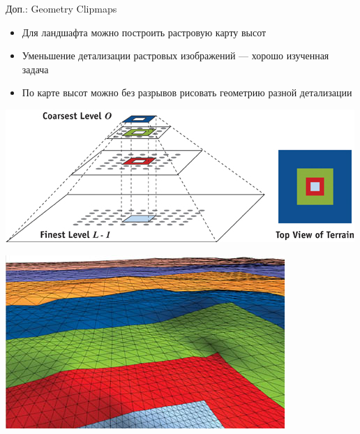 \begin{frame}{Доп.: Geometry Clipmaps}
    \begin{minipage}{.5\textwidth}
        \begin{itemize}
            \item Для ландшафта можно построить растровую карту высот
            \item Уменьшение детализации растровых изображений --- хорошо изученная задача
            \item По карте высот можно без разрывов рисовать геометрию разной детализации
        \end{itemize}
    \end{minipage}
    \begin{minipage}{.45\textwidth}
        \includegraphics[width=\textwidth]{02_clipmaps_01.jpg}

        \includegraphics[width=\textwidth]{02_clipmaps_02.jpg}
    \end{minipage}
\end{frame}


